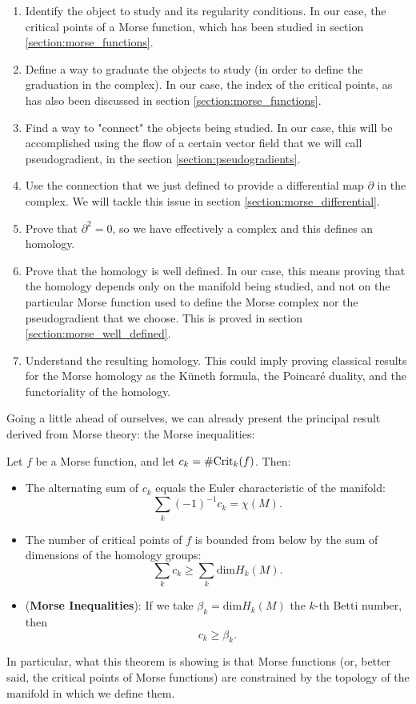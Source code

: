 \begin{enumerate}
\item Identify the object to study and its regularity conditions. In our case, the critical points of a Morse function, which has been studied in section \ref{section:morse_functions}.
\item Define a way to graduate the objects to study (in order to define the graduation in the complex). In our case, the index of the critical points, as has also been discussed in section \ref{section:morse_functions}.
\item Find a way to "connect" the objects being studied. In our case, this will be accomplished using the flow of a certain vector field that we will call pseudogradient, in the section \ref{section:pseudogradients}.
\item Use the connection that we just defined to provide a differential map $\partial$ in the complex. We will tackle this issue in section \ref{section:morse_differential}.
\item Prove that $\partial^2 = 0$, so we have effectively a complex and this defines an homology.
\item Prove that the homology is well defined. In our case, this means proving that the homology depends only on the manifold being studied, and not on the particular Morse function used to define the Morse complex nor the pseudogradient that we choose. This is proved in section \ref{section:morse_well_defined}.
\item Understand the resulting homology. This could imply proving classical results for the Morse homology as the Küneth formula, the Poincaré duality, and the functoriality of the homology.
\end{enumerate}

Going a little ahead of ourselves, we can already present the principal result derived from Morse theory: the Morse inequalities:

\begin{theo} Let $f$ be a Morse function, and let $c_k = \# \text{Crit}_k(f)$. Then:

\begin{itemize}
	\item The alternating sum of $c_k$ equals the Euler characteristic of the manifold:
	$$\sum_k (-1)^{-1}c_k = \chi(M) .$$
	\item The number of critical points of $f$ is bounded from below by the sum of dimensions of the homology groups:
	$$\sum_k c_k \geq \sum_k \text{dim} H_k(M) .$$
	\item ({\bf Morse Inequalities}): If we take $\beta_k = \text{dim} H_k(M)$ the $k$-th Betti number, then
	$$c_k \geq \beta_k .$$
\end{itemize}
\end{theo}

In particular, what this theorem is showing is that Morse functions (or, better said, the critical points of Morse functions) are constrained by the topology of the manifold in which we define them.
